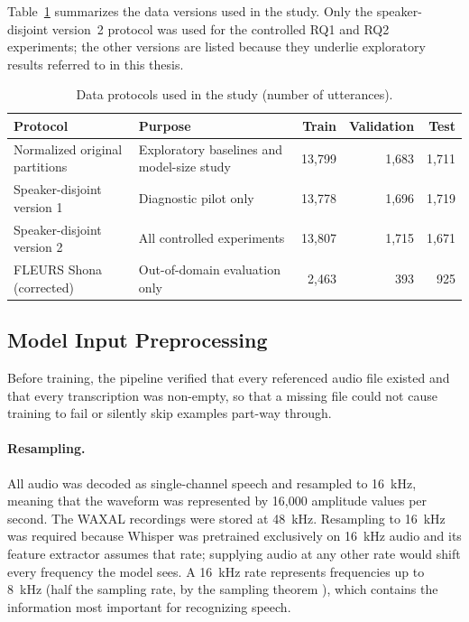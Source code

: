 Table~\ref{tab:protocols} summarizes the data versions used in the study. Only
the speaker-disjoint version~2 protocol was used for the controlled RQ1 and RQ2
experiments; the other versions are listed because they underlie exploratory
results referred to in this thesis.

\begin{table}[H]
    \centering
    \begin{tabular}{|p{4.2cm}|p{4.2cm}|r|r|r|}
        \hline
        Protocol & Purpose & Train & Validation & Test \\
        \hline
        Normalized original partitions & Exploratory baselines and model-size study & 13,799 & 1,683 & 1,711 \\
        \hline
        Speaker-disjoint version 1 & Diagnostic pilot only & 13,778 & 1,696 & 1,719 \\
        \hline
        Speaker-disjoint version 2 & All controlled experiments & 13,807 & 1,715 & 1,671 \\
        \hline
        FLEURS Shona (corrected) & Out-of-domain evaluation only & 2,463 & 393 & 925 \\
        \hline
    \end{tabular}
    \caption{Data protocols used in the study (number of utterances).}
    \label{tab:protocols}
\end{table}

\subsection{Model Input Preprocessing}
\label{sec:input-preprocessing}

Before training, the pipeline verified that every referenced audio file existed
and that every transcription was non-empty, so that a missing file could not
cause training to fail or silently skip examples part-way through.

\paragraph{Resampling.}
All audio was decoded as single-channel speech and resampled to 16~kHz, meaning
that the waveform was represented by 16,000 amplitude values per second. The
WAXAL recordings were stored at 48~kHz. Resampling to 16~kHz was required because
Whisper was pretrained exclusively on 16~kHz audio and its feature extractor
assumes that rate; supplying audio at any other rate would shift every frequency
the model sees. A 16~kHz rate represents frequencies up to 8~kHz (half the
sampling rate, by the sampling theorem \citep{Shannon1949}), which contains the
information most important for recognizing speech.

